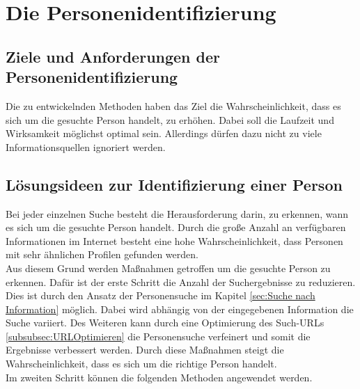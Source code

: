 \section{Die Personenidentifizierung}
	\subsection{Ziele und Anforderungen der Personenidentifizierung}
	Die zu entwickelnden Methoden haben das Ziel die Wahrscheinlichkeit, dass es sich um die gesuchte Person handelt, zu erhöhen. Dabei soll die Laufzeit und Wirksamkeit möglichst optimal sein. Allerdings dürfen dazu nicht zu viele Informationsquellen ignoriert werden.
	
	\subsection{Lösungsideen zur Identifizierung einer Person}
	\label{sec:WannhandeltessichumdiegesuchtePerson}
	Bei jeder einzelnen Suche besteht die Herausforderung darin, zu erkennen, wann es sich um die gesuchte Person handelt. Durch die große Anzahl an verfügbaren Informationen im Internet besteht eine hohe Wahrscheinlichkeit, dass Personen mit sehr ähnlichen Profilen gefunden werden.\\
	Aus diesem Grund werden Maßnahmen getroffen um die gesuchte Person zu erkennen. Dafür ist der erste Schritt die Anzahl der Suchergebnisse zu reduzieren. Dies ist durch den Ansatz der Personensuche im Kapitel \ref{sec:Suche nach Information} möglich. Dabei wird abhängig von der eingegebenen Information die Suche variiert. Des Weiteren kann durch eine Optimierung des Such-URLs \ref{subsubsec:URLOptimieren} die Personensuche verfeinert und somit die Ergebnisse verbessert werden. Durch diese Maßnahmen steigt die Wahrscheinlichkeit, dass es sich um die richtige Person handelt.\\
	Im zweiten Schritt können die folgenden Methoden angewendet werden.

